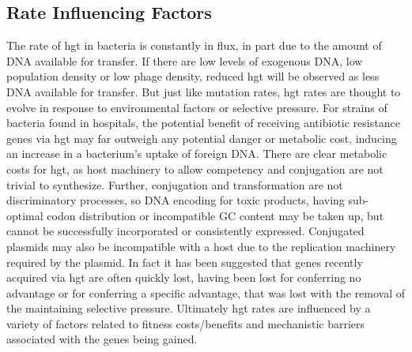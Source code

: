 \documentclass[12pt,letter]{article}
\begin{document}
\subsection*{Rate Influencing Factors}
The rate of \ac{hgt} in bacteria is constantly in flux, in part due to the amount of DNA available for transfer\citep{trendbs}.
If there are low levels of exogenous DNA, low population density or low phage density, reduced \ac{hgt} will be observed as less DNA available for transfer\citep{lgt}.
But just like mutation rates, \ac{hgt} rates are thought to evolve in response to environmental factors or selective pressure\citep{mtrate,hgtrate}.
For strains of bacteria found in hospitals, the potential benefit of receiving antibiotic resistance genes via \ac{hgt} may far outweigh any potential danger or metabolic cost, inducing an increase in a bacterium's uptake of foreign DNA.\citep{hospital}
There are clear metabolic costs for \ac{hgt}, as host machinery to allow competency and conjugation are not trivial to synthesize\citep{hgtcost}.
Further, conjugation and transformation are not discriminatory processes, so DNA encoding for toxic products, having sub-optimal codon distribution or incompatible GC content may be taken up, but cannot be successfully incorporated or consistently expressed\citep{hgtcost}.
Conjugated plasmids may also be incompatible with a host due to the replication machinery required by the plasmid\citep{plasincom}.
In fact it has been suggested that genes recently acquired via \ac{hgt} are often quickly lost, having been lost for conferring no advantage or for conferring a specific advantage, that was lost with the removal of the maintaining selective pressure\citep{fastlane}.
Ultimately \ac{hgt} rates are influenced by a variety of factors related to fitness costs/benefits and mechanistic barriers associated with the genes being gained.
\end{document}
